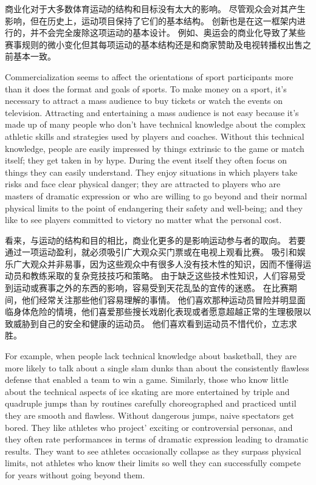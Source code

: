\documentclass[cs4size, a4paper, 12pt]{article}
\newcounter{numpar}
\newcommand*{\newpar}{\numpar{}}
\begin{document}
	商业化对于大多数体育运动的结构和目标没有太大的影响。 尽管观众会对其产生影响，但在历史上，运动项目保持了它们的基本结构。 创新也是在这一框架内进行的，并不会完全废除这项运动的基本设计。 例如、奥运会的商业化导致了某些赛事规则的微小变化但其每项运动的基本结构还是和商家赞助及电视转播权出售之前基本一致。 
	
	\newpar Commercialization seems to affect the orientations of sport participants more than it does the format and goals of sports. To make money on a sport, it's necessary to attract a mass audience to buy tickets or watch the events on television. Attracting and entertaining a mass audience is not easy because it's made up of many people who don't have technical knowledge about the complex athletic skills and strategies used by players and coaches. Without this technical knowledge, people are easily impressed by things extrinsic to the game or match itself; they get taken in by hype. During the event itself they often focus on things they can easily understand. They enjoy situations in which players take risks and face clear physical danger; they are attracted to players who are masters of dramatic expression or who are willing to go beyond and their normal physical limits to the point of endangering their safety and well-being; and they like to see players committed to victory no matter what the personal cost.
	
	看来，与运动的结构和目的相比，商业化更多的是影响运动参与者的取向。 若要通过一项运动盈利，就必须吸引广大观众买门票或在电视上观看比赛。 吸引和娱乐广大观众并非易事，因为这些观众中有很多人没有技木性的知识，因而不懂得运动员和教练采取的复杂竞技技巧和策略。 由于缺乏这些技术性知识，人们容易受到运动或赛事之外的东西的影响，容易受到天花乱坠的宜传的迷惑。 在比赛期间，他们经常关注那些他们容易理解的事情。 他们喜欢那种运动员冒险并明显面临身体危险的情境，他们喜爱那些搜长戏剧化表现或者愿意超越正常的生理极限以致威胁到自己的安全和健康的运动员。 他们喜欢看到运动员不惜代价，立志求胜。 
	
	\newpar For example, when people lack technical knowledge about basketball, they are more likely to talk about a single slam dunks than about the consistently flawless defense that enabled a team to win a game. Similarly, those who know little about the technical aspects of ice skating are more entertained by triple and quadruple jumps than by routines carefully choreographed and practiced until they are smooth and flawless. Without dangerous jumps, naive spectators get bored. They like athletes who project' exciting or controversial personas, and they often rate performances in terms of dramatic expression leading to dramatic results. They want to see athletes occasionally collapse as they surpass physical limits, not athletes who know their limits so well they can successfully compete for years without going beyond them.
	
\end{document}
